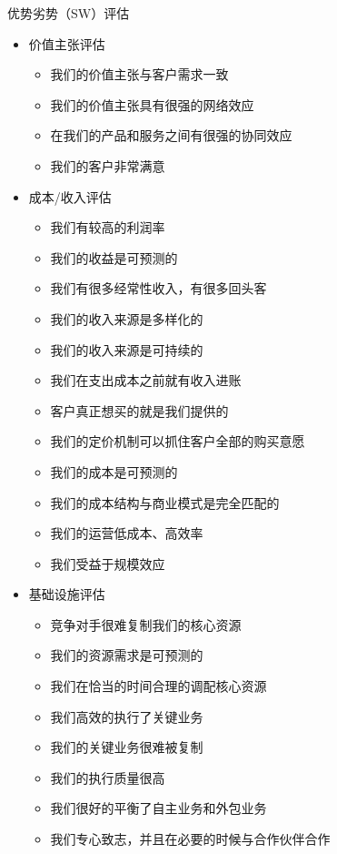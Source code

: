 优势劣势（SW）评估
\begin{multicols}{2}
\begin{itemize}
    \item 价值主张评估
    \begin{itemize}
        \item 我们的价值主张与客户需求一致
        \item 我们的价值主张具有很强的网络效应
        \item 在我们的产品和服务之间有很强的协同效应
        \item 我们的客户非常满意
    \end{itemize}
    \item 成本/收入评估
    \begin{itemize}
        \item 我们有较高的利润率
        \item 我们的收益是可预测的
        \item 我们有很多经常性收入，有很多回头客
        \item 我们的收入来源是多样化的
        \item 我们的收入来源是可持续的
        \item 我们在支出成本之前就有收入进账
        \item 客户真正想买的就是我们提供的
        \item 我们的定价机制可以抓住客户全部的购买意愿
        \item 我们的成本是可预测的
        \item 我们的成本结构与商业模式是完全匹配的
        \item 我们的运营低成本、高效率
        \item 我们受益于规模效应
    \end{itemize}
    \item 基础设施评估
    \begin{itemize}
        \item 竞争对手很难复制我们的核心资源
        \item 我们的资源需求是可预测的
        \item 我们在恰当的时间合理的调配核心资源
        \item 我们高效的执行了关键业务
        \item 我们的关键业务很难被复制
        \item 我们的执行质量很高
        \item 我们很好的平衡了自主业务和外包业务
        \item 我们专心致志，并且在必要的时候与合作伙伴合作

\end{itemize}
\end{itemize}
\end{multicols}
